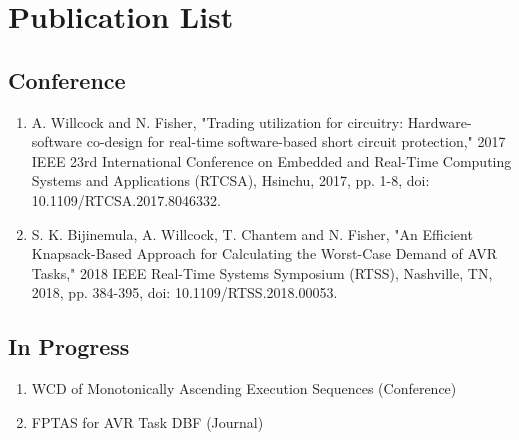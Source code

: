 \section{Publication List}   \label{chap:publicationList}

\subsection{Conference}

\begin{enumerate}
    \item A. Willcock and N. Fisher, "Trading utilization for circuitry: Hardware-software co-design for real-time software-based short circuit protection," 2017 IEEE 23rd International Conference on Embedded and Real-Time Computing Systems and Applications (RTCSA), Hsinchu, 2017, pp. 1-8, doi: 10.1109/RTCSA.2017.8046332. \cite{willcock_trading_2017}
    \item S. K. Bijinemula, A. Willcock, T. Chantem and N. Fisher, "An Efficient Knapsack-Based Approach for Calculating the Worst-Case Demand of AVR Tasks," 2018 IEEE Real-Time Systems Symposium (RTSS), Nashville, TN, 2018, pp. 384-395, doi: 10.1109/RTSS.2018.00053. \cite{bijinemula_efficient_2019}
\end{enumerate}

\subsection{In Progress}

\begin{enumerate}
    \item WCD of Monotonically Ascending Execution Sequences (Conference)
    \item FPTAS for AVR Task DBF (Journal)
\end{enumerate}